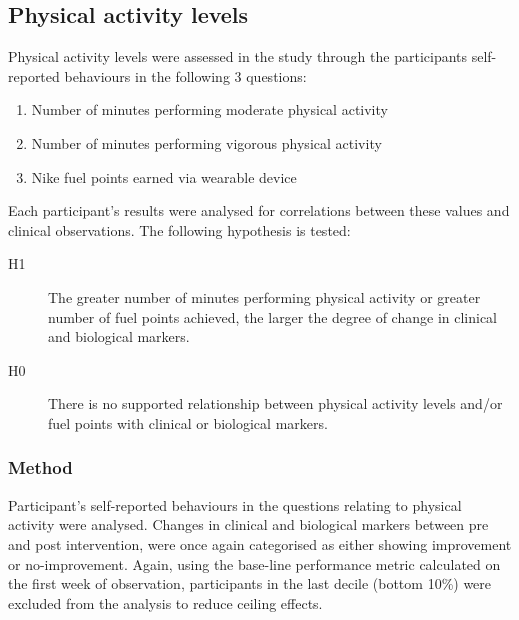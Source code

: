 \subsection{Physical activity levels}
Physical activity levels were assessed in the study through the participants self-reported behaviours in the following 3 questions:
\begin{enumerate}[noitemsep,topsep=0pt]
	\item Number of minutes performing moderate physical activity
	\item Number of minutes performing vigorous physical activity
	\item Nike fuel points earned via wearable device
\end{enumerate}

Each participant’s results were analysed for correlations between these values and clinical observations. The following hypothesis is tested:
\begin{description}
  \item[H1] The greater number of minutes performing physical activity or greater number of fuel points achieved, the larger the degree of change in clinical and biological markers.
  \item[H0] There is no supported relationship between physical activity levels and/or fuel points with clinical or biological markers.
  \end{description}

\subsubsection{Method}
Participant's self-reported behaviours in the questions relating to physical activity were analysed. Changes in clinical and biological markers between pre and post intervention, were once again categorised as either showing improvement or no-improvement.
Again, using the base-line performance metric calculated on the first week of observation, participants in the last decile (bottom 10\%) were excluded from the analysis to reduce ceiling effects.

